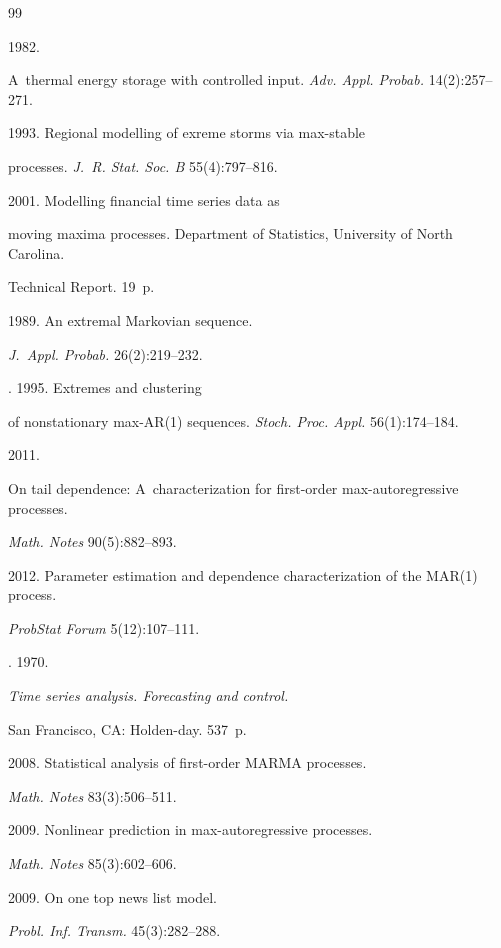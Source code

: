 {{\begin{thebibliography}{99}


 1982. 


A~thermal energy storage with controlled input. \textit{Adv. Appl. Probab.} 14(2):257--271.




 1993. Regional modelling of exreme storms via max-stable


processes. \textit{J.~R. Stat. Soc. B} 55(4):797--816.




 2001. Modelling financial time series data as


moving maxima processes.  Department of Statistics, University of North Carolina. 


Technical Report. 19~p.




 1989. An extremal Markovian sequence.


\textit{J.~Appl. Probab.} 26(2):219--232.




. 1995. Extremes and clustering


of nonstationary max-AR(1) sequences. \textit{Stoch. Proc. Appl.} 56(1):174--184.




 2011. 


On tail dependence: A~characterization for first-order max-autoregressive processes.


\textit{Math. Notes} 90(5):882--893.




 2012. Parameter estimation and dependence characterization of the MAR(1) process.


\textit{ProbStat Forum} 5(12):107--111.




. 1970. 


\textit{Time series analysis. Forecasting and control.} 


San Francisco, CA: Holden-day. 537~p.




 2008. Statistical analysis of first-order MARMA processes. 


\textit{Math. Notes} 83(3):506--511.




 2009. Nonlinear prediction in max-autoregressive processes. 


\textit{Math. Notes} 85(3):602--606.




 2009. On one top news list model. 


\textit{Probl. Inf. Transm.} 45(3):282--288.


\end{thebibliography}


} }
